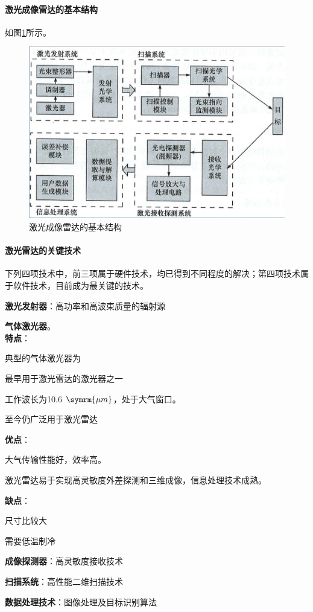 \paragraph{激光成像雷达的基本结构} 如图\ref{fig:激光成像雷达的基本结构}所示。
\begin{figure}[htbp]
	\centering
	\includegraphics[width=0.7\linewidth]{figure/Chapter1/激光成像雷达的基本结构.jpg}
	\caption{激光成像雷达的基本结构}
	\label{fig:激光成像雷达的基本结构}
\end{figure}
\paragraph{激光雷达的关键技术} 下列四项技术中，前三项属于硬件技术，均已得到不同程度的解决；第四项技术属于软件技术，目前成为最关键的技术。
\begin{enumerate*}
	\item \textbf{激光发射器}：高功率和高波束质量的辐射源
	\begin{enumerate*}
		\item \textbf{气体激光器}。\\
		\textbf{特点}：\begin{itemize*}
			\item 典型的气体激光器为
			\item 最早用于激光雷达的激光器之一
			\item 工作波长为10.6 $ \symrm{\mu m} $，处于大气窗口。
			\item 至今仍广泛用于激光雷达
		\end{itemize*}
		\textbf{优点}：\begin{itemize*}
			\item 大气传输性能好，效率高。
			\item {}激光雷达易于实现高灵敏度外差探测和三维成像，信息处理技术成熟。
		\end{itemize*}
		\textbf{缺点}：\begin{itemize*}
			\item 尺寸比较大
			\item 需要低温制冷
		\end{itemize*}
	\end{enumerate*}
	\item \textbf{成像探测器}：高灵敏度接收技术
	\item \textbf{扫描系统}：高性能二维扫描技术
	\item \textbf{数据处理技术}：图像处理及目标识别算法
\end{enumerate*}